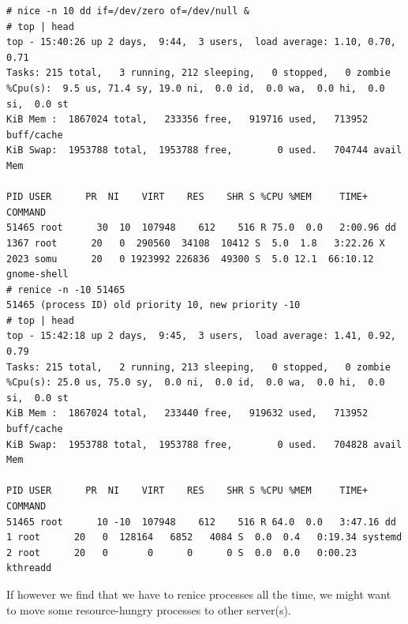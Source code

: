 \vspace{-15pt}
\begin{verbatim}
# nice -n 10 dd if=/dev/zero of=/dev/null &
# top | head
top - 15:40:26 up 2 days,  9:44,  3 users,  load average: 1.10, 0.70, 0.71
Tasks: 215 total,   3 running, 212 sleeping,   0 stopped,   0 zombie
%Cpu(s):  9.5 us, 71.4 sy, 19.0 ni,  0.0 id,  0.0 wa,  0.0 hi,  0.0 si,  0.0 st
KiB Mem :  1867024 total,   233356 free,   919716 used,   713952 buff/cache
KiB Swap:  1953788 total,  1953788 free,        0 used.   704744 avail Mem 

PID USER      PR  NI    VIRT    RES    SHR S %CPU %MEM     TIME+ COMMAND                                                                    
51465 root      30  10  107948    612    516 R 75.0  0.0   2:00.96 dd                                                                         
1367 root      20   0  290560  34108  10412 S  5.0  1.8   3:22.26 X                                                                          
2023 somu      20   0 1923992 226836  49300 S  5.0 12.1  66:10.12 gnome-shell                                                                
# renice -n -10 51465
51465 (process ID) old priority 10, new priority -10
# top | head
top - 15:42:18 up 2 days,  9:45,  3 users,  load average: 1.41, 0.92, 0.79
Tasks: 215 total,   2 running, 213 sleeping,   0 stopped,   0 zombie
%Cpu(s): 25.0 us, 75.0 sy,  0.0 ni,  0.0 id,  0.0 wa,  0.0 hi,  0.0 si,  0.0 st
KiB Mem :  1867024 total,   233440 free,   919632 used,   713952 buff/cache
KiB Swap:  1953788 total,  1953788 free,        0 used.   704828 avail Mem 

PID USER      PR  NI    VIRT    RES    SHR S %CPU %MEM     TIME+ COMMAND                                                                    
51465 root      10 -10  107948    612    516 R 64.0  0.0   3:47.16 dd                                                                         
1 root      20   0  128164   6852   4084 S  0.0  0.4   0:19.34 systemd                                                                    
2 root      20   0       0      0      0 S  0.0  0.0   0:00.23 kthreadd                                    
\end{verbatim}
\vspace{-10pt}

\noindent
If however we find that we have to renice processes all the time, we might want to move some resource-hungry processes to other server(s). 

